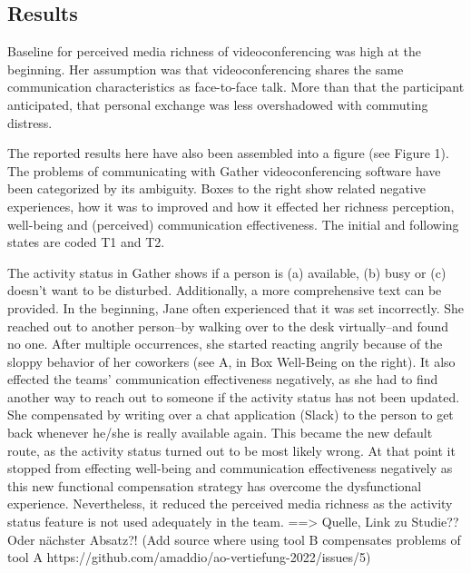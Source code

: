 \documentclass[man]{apa7}
\begin{document}
\subsection{Results}

Baseline for perceived media richness of videoconferencing was high at the beginning. Her assumption was that videoconferencing shares the same communication characteristics as face-to-face talk. More than that the participant anticipated, that personal exchange was less overshadowed with commuting distress.

The reported results here have also been assembled into a figure (see Figure 1). The problems of communicating with Gather videoconferencing software have been categorized by its ambiguity. Boxes to the right show related negative experiences, how it was to improved and how it effected her richness perception, well-being and (perceived) communication effectiveness. The initial and following states are coded T1 and T2.

The activity status in Gather shows if a person is (a) available, (b) busy or (c) doesn't want to be disturbed. Additionally, a more comprehensive text can be provided. In the beginning, Jane often experienced that it was set incorrectly. She reached out to another person–by walking over to the desk virtually–and found no one. After multiple occurrences, she started reacting angrily because of the sloppy behavior of her coworkers (see A, in Box Well-Being on the right). It also effected the teams' communication effectiveness negatively, as she had to find another way to reach out to someone if the activity status has not been updated. She compensated by writing over a chat application (Slack) to the person to get back whenever he/she is really available again. This became the new default route, as the activity status turned out to be most likely wrong. At that point it stopped from effecting well-being and communication effectiveness negatively as this new functional compensation strategy has overcome the dysfunctional experience. Nevertheless, it reduced the perceived media richness as the activity status feature is not used adequately in the team. ==> Quelle, Link zu Studie?? Oder nächster Absatz?! (Add source where using tool B compensates problems of tool A https://github.com/amaddio/ao-vertiefung-2022/issues/5)
\end{document}
